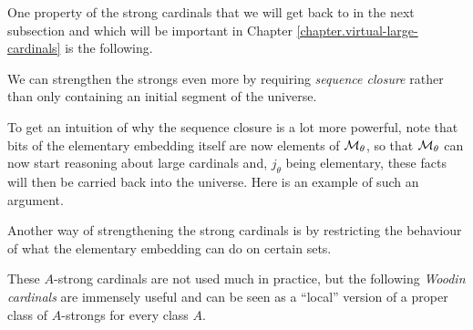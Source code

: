 \documentclass[../../main]{subfiles}
\begin{document}

One property of the strong cardinals that we will get back to in the next subsection and which will be important in Chapter \ref{chapter.virtual-large-cardinals} is the following.


We can strengthen the strongs even more by requiring \textit{sequence closure} rather than only containing an initial segment of the universe.


To get an intuition of why the sequence closure is a lot more powerful, note that bits of the elementary embedding itself are now elements of $\operatorname{\mathcal M}_\theta$, so that $\operatorname{\mathcal M}_\theta$ can now start reasoning about large cardinals and, $j_\theta$ being elementary, these facts will then be carried back into the universe. Here is an example of such an argument.


Another way of strengthening the strong cardinals is by restricting the behaviour of what the elementary embedding can do on certain sets.


These $A$-strong cardinals are not used much in practice, but the following \textit{Woodin cardinals} are immensely useful and can be seen as a ``local'' version of a proper class of $A$-strongs for every class $A$.
\end{document}
